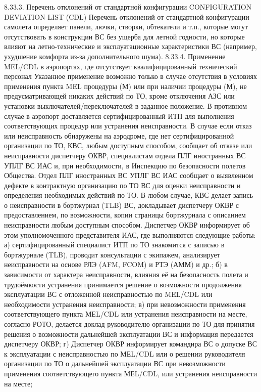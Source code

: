 8.33.3. Перечень отклонений от стандартной конфигурации CONFIGURATION DEVIATION 
                                                                        LIST (CDL)
Перечень отклонений от стандартной конфигурации самолета определяет панели, лючки, створки, обтекатели и т.п., которые могут отсутствовать в конструкции ВС без ущерба для летной годности, но которые влияют на летно-технические и эксплуатационные характеристики ВС (например, ухудшение комфорта из-за дополнительного шума).
8.33.4. Применение MEL/CDL в аэропортах, где отсутствует квалифицированный 
                                                      технический персонал
Указанное применение возможно только в случае отсутствия в условиях применения пункта MEL процедуры (М) или при наличии процедуры (М), не предусматривающей никаких действий по ТО, кроме отключения АЗС или установки выключателей/переключателей в заданное положение. В противном случае в аэропорт доставляется сертифицированный ИТП для выполнения соответствующих процедур или устранения неисправности.
В случае если отказ или неисправность обнаружены на аэродроме, где нет сертифицированной организации по ТО, КВС, любым доступным способом, сообщает об отказе или неисправности диспетчеру ОКВР, специалистам отдела ПЛГ иностранных ВС УПЛГ ВС ИАС и, при необходимости, в Инспекцию по безопасности полетов Общества.
Отдел ПЛГ иностранных ВС УПЛГ ВС ИАС сообщает о выявленном дефекте в контрактную организацию по ТО ВС для оценки неисправности и определения необходимых действий по ТО. 
В любом случае, КВС делает запись о неисправности в бортжурнал (TLB) ВС, докладывает диспетчеру   ОКВР с предоставлением, по возможности, копии страницы бортжурнала с описанием неисправности любым доступным способом.
Диспетчер ОКВР информирует об этом уполномоченного представителя ИАС, где выполняются следующие работы:
а)	сертифицированный специалист ИТП по ТО знакомится с записью в бортжурнале (TLB), проводит консультации с экипажем, анализирует неисправности на основе РЛЭ (AFM, FCOM) и РТЭ (АММ) и др.;
б)	в зависимости от характера неисправности, влияния её на безопасность полета и трудоёмкости устранения принимается решение о возможности продолжения эксплуатации ВС с отложенной неисправностью по MEL/CDL или необходимости устранения неисправности;
в)	при невозможности применения соответствующего пункта МЕL/CDL или устранения неисправности на месте, согласно РОТО, делается доклад руководителю организации по ТО для принятия решения о возможности дальнейшей эксплуатации ВС и информация передается диспетчеру ОКВР;
г)	Диспетчер ОКВР информирует командира ВС о допуске ВС к эксплуатации с неисправностью по МЕL/CDL или о решении руководителя организации по ТО о дальнейшей эксплуатации ВС при невозможности применения соответствующего пункта МЕL/CDL, или устранения неисправности на месте;
